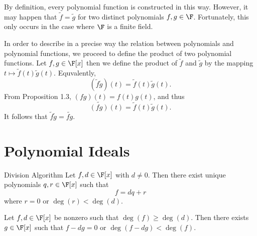 \documentclass[linearalgebraII]{subfiles}
\begin{document}
    \begin{remark}
        By definition, every polynomial function is constructed in this way. However, it may happen that $\tilde{f}=\tilde{g}$ for two distinct polynomials $f,g\in \F$. Fortunately, this only occurs in the case where $\F$ is a finite field.
    \end{remark}

    \begin{remark}
        In order to describe in a precise way the relation between polynomials and polynomial functions, we proceed to define the product of two polynomial functions. Let $f,g\in\F[x]$ then we define the product of $\tilde{f}$ and $\tilde{g}$ by the mapping $t\mapsto \tilde{f}(t)\tilde{g}(t)$. Equvalently,
        \begin{equation*}
            \left( \tilde{f}\tilde{g} \right)(t) = \tilde{f}(t)\tilde{g}(t).
        \end{equation*}
        From Proposition 1.3, $(fg)(t) = f(t)g(t)$, and thus
        \begin{equation*}
            \widetilde{(fg)}(t) = \tilde{f}(t)\tilde{g}(t).
        \end{equation*}
        It follows that $\tilde{f}\tilde{g} = \widetilde{fg}$.
    \end{remark}

    \section{Polynomial Ideals}

    \begin{theorem}{Division Algorithm}
        Let $f,d\in \F[x]$ with $d\neq 0$. Then there exist unique polynomials $q,r\in \F[x]$ such that
        \begin{equation*}
            f = dq+r
        \end{equation*}
        where $r = 0$ or $\deg(r)<\deg(d)$.
    \end{theorem}

    \begin{lemma_inside}{}
        Let $f,d\in \F[x]$ be nonzero such that $\deg(f)\geq\deg(d)$. Then there exists $g\in \F[x]$ such that $f-dg = 0$ or $\deg(f-dg) < \deg(f)$.
    \end{lemma_inside}
\end{document}

